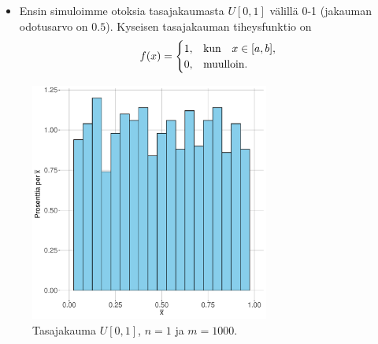 \documentclass{beamer}
\begin{document}

\begin{frame}
  \begin{itemize}
    \item Ensin simuloimme otoksia tasajakaumasta $U[0,1]$ välillä 0-1 (jakauman
    odotusarvo on $0.5$). Kyseisen tasajakauman tiheysfunktio on
    \begin{equation*}
      f(x) =
      \begin{cases}
        1, &\textnormal{kun}\quad x\in[a,b], \\
        0, &\textnormal{muulloin}. 
      \end{cases}
    \end{equation*}
  \end{itemize}
\end{frame}


\begin{frame}
  \begin{center}
    \begin{figure}
      \includegraphics[width=0.7\textwidth, height=0.7\textwidth]{unif-n-1.pdf}
      \caption{Tasajakauma $U[0,1]$, $n = 1$ ja $m = 1000$.}
    \end{figure}
  \end{center}
\end{frame}

\end{document}
